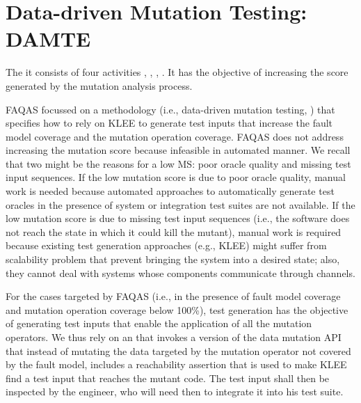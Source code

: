 



\section{Data-driven Mutation Testing: DAMTE} %
\label{sec:data:test_suite_augmentation}

\STARTCHANGEDWPT

The  it consists of four activities , , , . It has the objective of increasing the score generated by the mutation analysis process.

FAQAS focussed on a methodology (i.e., data-driven mutation testing, ) that specifies how to rely on KLEE to generate test inputs that increase the fault model coverage and the mutation operation coverage.
FAQAS does not address increasing the mutation score because infeasible in automated manner.
We recall that two might be the reasons for a low MS: poor oracle quality and missing test input sequences.
If the low mutation score is due to poor oracle quality, manual work is needed because automated approaches to automatically generate test oracles in the presence of system or integration test suites are not available. 
If the low mutation score is due to missing test input sequences (i.e., the software does not reach the state in which it could kill the mutant), manual work is required because existing test generation approaches (e.g., KLEE) might suffer from scalability problem that prevent bringing the system into a desired state; also, they cannot deal with systems whose components communicate through channels. 

For the cases targeted by FAQAS (i.e.,
in the presence of fault model coverage and mutation operation coverage below 100\%), test generation has the objective of generating test inputs that enable the application of all the mutation operators. 
We thus rely on an   that
invokes a version of the data mutation API that instead of mutating the data targeted by the mutation operator not covered by the fault model, includes a reachability assertion that is used to make KLEE find a test input that reaches the mutant code. The test input shall then be inspected by the engineer, who will need then to integrate it into his test suite.
%
%
%
%







